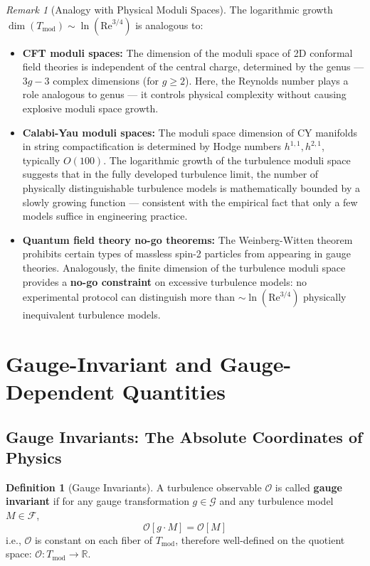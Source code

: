 \documentclass[12pt,a4paper]{article}
\theoremstyle{plain}
\theoremstyle{definition}
\newtheorem{definition}[theorem]{Definition}
\theoremstyle{remark}
\newtheorem{remark}[theorem]{Remark}
\newcommand{\R}{\mathbb{R}}
\newcommand{\F}{\mathcal{F}}
\newcommand{\G}{\mathcal{G}}
\newcommand{\Tmod}{T_{\text{mod}}}
\newcommand{\ReNum}{\mathrm{Re}}
\begin{document}
\begin{remark}[Analogy with Physical Moduli Spaces]
The logarithmic growth $\dim(\Tmod) \sim \ln(\ReNum^{3/4})$ is analogous to:
\begin{itemize}
    \item \textbf{CFT moduli spaces:} The dimension of the moduli space of 2D conformal field theories is independent of the central charge, determined by the genus --- $3g-3$ complex dimensions (for $g\geq2$). Here, the Reynolds number plays a role analogous to genus --- it controls physical complexity without causing explosive moduli space growth.
    \item \textbf{Calabi-Yau moduli spaces:} The moduli space dimension of CY manifolds in string compactification is determined by Hodge numbers $h^{1,1}, h^{2,1}$, typically $O(100)$. The logarithmic growth of the turbulence moduli space suggests that in the fully developed turbulence limit, the number of physically distinguishable turbulence models is mathematically bounded by a slowly growing function --- consistent with the empirical fact that only a few models suffice in engineering practice.
    \item \textbf{Quantum field theory no-go theorems:} The Weinberg-Witten theorem prohibits certain types of massless spin-2 particles from appearing in gauge theories. Analogously, the finite dimension of the turbulence moduli space provides a \textbf{no-go constraint} on excessive turbulence models: no experimental protocol can distinguish more than $\sim\ln(\ReNum^{3/4})$ physically inequivalent turbulence models.
\end{itemize}
\end{remark}

\section{Gauge-Invariant and Gauge-Dependent Quantities}

\subsection{Gauge Invariants: The Absolute Coordinates of Physics}

\begin{definition}[Gauge Invariants]
A turbulence observable $\mathcal{O}$ is called \textbf{gauge invariant} if for any gauge transformation $g\in\G$ and any turbulence model $M\in\F$,
\begin{equation}
\mathcal{O}[g\cdot M] = \mathcal{O}[M]
\label{eq:gauge_inv_def}
\end{equation}
i.e., $\mathcal{O}$ is constant on each fiber of $\Tmod$, therefore well-defined on the quotient space: $\mathcal{O}: \Tmod \to \R$.
\end{definition}
\end{document}
